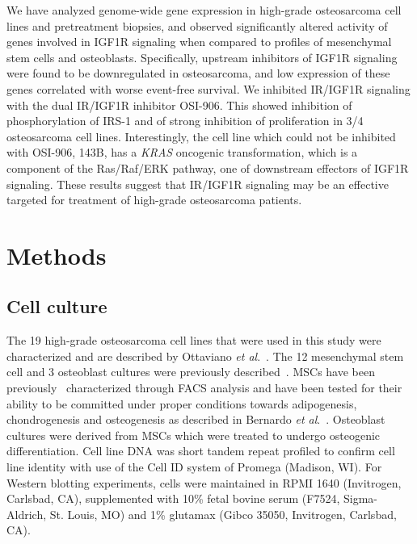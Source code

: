 We have analyzed genome\hyp{}wide gene expression in high\hyp{}grade osteosarcoma cell lines and pretreatment biopsies, and observed significantly altered activity of genes involved in IGF1R signaling when compared to profiles of mesenchymal stem cells and osteoblasts. Specifically, upstream inhibitors of IGF1R signaling were found to be downregulated in osteosarcoma, and low expression of these genes correlated with worse event\hyp{}free survival. We inhibited IR/IGF1R signaling with the dual IR/IGF1R inhibitor OSI-906. This showed inhibition of phosphorylation of IRS-1 and of strong inhibition of proliferation in 3/4 osteosarcoma cell lines. Interestingly, the cell line which could not be inhibited with OSI-906, 143B, has a {\it KRAS} oncogenic transformation, which is a component of the Ras/Raf/ERK pathway, one of downstream effectors of IGF1R signaling. These results suggest that IR/IGF1R signaling may be an effective targeted for treatment of high\hyp{}grade osteosarcoma patients.

\section{Methods}\label{methods5}
\subsection{Cell culture}
The 19 high\hyp{}grade osteosarcoma cell lines that were used in this study were characterized and are described by Ottaviano {\it et al}.~\cite{ottaviano2010molecular}. The 12 mesenchymal stem cell and 3 osteoblast cultures were previously described~\cite{kuijjer2012identification}. MSCs have been previously~\cite{cleton2009profiling} characterized through FACS analysis and have been tested for their ability to be committed under proper conditions towards adipogenesis, chondrogenesis and osteogenesis as described in Bernardo {\it et al}.~\cite{bernardo2007human}. Osteoblast cultures were derived from MSCs which were treated to undergo osteogenic differentiation. Cell line DNA was short tandem repeat profiled to confirm cell line identity with use of the Cell ID system of Promega (Madison, WI). For Western blotting experiments, cells were maintained in RPMI 1640 (Invitrogen, Carlsbad, CA), supplemented with 10\% fetal bovine serum (F7524, Sigma-Aldrich, St. Louis, MO) and 1\% glutamax (Gibco 35050, Invitrogen, Carlsbad, CA).

